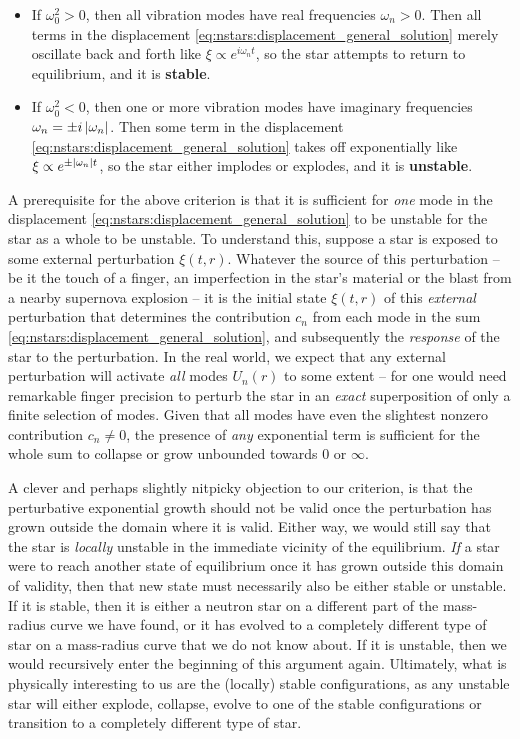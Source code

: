 \begin{itemize}
\item If $\omega_0^2 > 0$, then all vibration modes have real frequencies $\omega_n > 0$.
      Then all terms in the displacement \eqref{eq:nstars:displacement_general_solution} merely oscillate back and forth like $\xi \propto e^{i \omega_n t}$, so the star attempts to return to equilibrium, and it is \textbf{stable}.
\item If $\omega_0^2 < 0$, then one or more vibration modes have imaginary frequencies $\omega_n = \pm i \left\lvert \omega_n \right\rvert$.
      Then some term in the displacement \eqref{eq:nstars:displacement_general_solution} takes off exponentially like $\xi \propto e^{\pm \left\lvert \omega_n \right\rvert t}$, so the star either implodes or explodes, and it is \textbf{unstable}.
\end{itemize}
A prerequisite for the above criterion is that it is sufficient for \emph{one} mode in the displacement \eqref{eq:nstars:displacement_general_solution} to be unstable for the star as a whole to be unstable.
To understand this, suppose a star is exposed to some external perturbation $\xi(t,r)$.
Whatever the source of this perturbation -- be it the touch of a finger, an imperfection in the star's material or the blast from a nearby supernova explosion -- it is the initial state $\xi(t,r)$ of this \emph{external} perturbation that determines the contribution $c_n$ from each mode in the sum \eqref{eq:nstars:displacement_general_solution}, and subsequently the \emph{response} of the star to the perturbation.
In the real world, we expect that any external perturbation will activate \emph{all} modes $U_n(r)$ to some extent -- for one would need remarkable finger precision to perturb the star in an \emph{exact} superposition of only a finite selection of modes.
Given that all modes have even the slightest nonzero contribution $c_n \neq 0$, the presence of \emph{any} exponential term is sufficient for the whole sum to collapse or grow unbounded towards $0$ or $\infty$.

A clever and perhaps slightly nitpicky objection to our criterion, is that the perturbative exponential growth should not be valid once the perturbation has grown outside the domain where it is valid.
Either way, we would still say that the star is \emph{locally} unstable in the immediate vicinity of the equilibrium.
\emph{If} a star were to reach another state of equilibrium once it has grown outside this domain of validity, then that new state must necessarily also be either stable or unstable.
If it is stable, then it is either a neutron star on a different part of the mass-radius curve we have found, or it has evolved to a completely different type of star on a mass-radius curve that we do not know about.
If it is unstable, then we would recursively enter the beginning of this argument again.
Ultimately, what is physically interesting to us are the (locally) stable configurations, as any unstable star will either explode, collapse, evolve to one of the stable configurations or transition to a completely different type of star.

